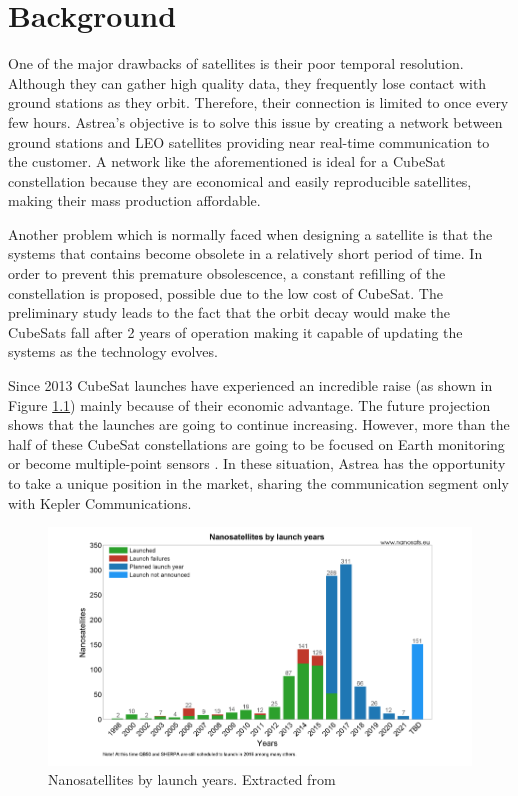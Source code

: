\chapter{Background}
One of the major drawbacks of satellites is their poor temporal resolution. Although they can gather high quality data, they frequently lose contact with ground stations as they orbit. Therefore, their connection is limited to once every few hours. Astrea’s objective is to solve this issue by creating a network between ground stations and LEO satellites providing near real-time communication to the customer. A network like the aforementioned is ideal for a CubeSat constellation because they are economical and easily reproducible satellites, making their mass production affordable.

Another problem which is normally faced when designing a satellite is that the systems that contains become obsolete in a relatively short period of time. In order to prevent this premature obsolescence, a constant refilling of the constellation is proposed, possible due to the low cost of CubeSat. The preliminary study leads to the fact that the orbit decay would make the CubeSats fall after 2 years of operation making it capable of updating the systems as the technology evolves.

Since 2013 CubeSat launches have experienced an incredible raise (as shown in Figure \ref{launches}) mainly because of their economic advantage. The future projection shows that the launches are going to continue increasing. However, more than the half of these CubeSat constellations are going to be focused on Earth monitoring or become multiple-point sensors \cite{SpaceWorks}. In these situation, Astrea has the opportunity to take a unique position in the market, sharing the communication segment only with Kepler Communications\cite{keppler}.

\begin{figure}[H]
\centering
\includegraphics[scale=0.4]{img/launches.png}
\caption[Nanosatellites by launch years]{Nanosatellites by launch years. Extracted from \cite{nanosats}}
\label{launches}
\end{figure}

